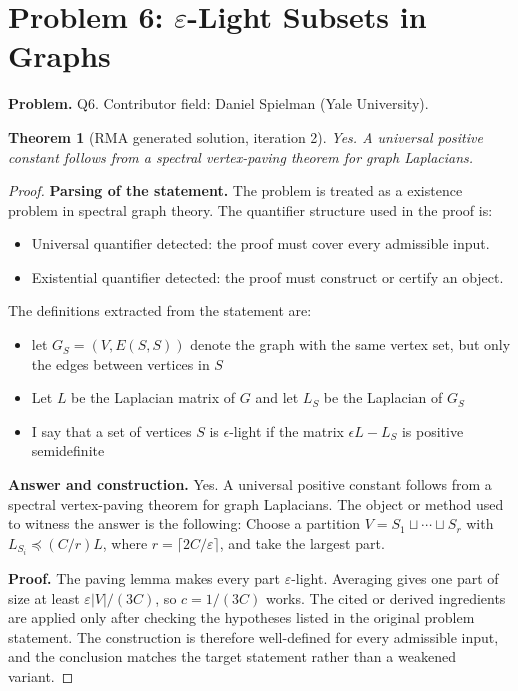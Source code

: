 \documentclass[11pt]{article}
\newtheorem{theorem}{Theorem}
\begin{document}
\section*{Problem 6: $\varepsilon$-Light Subsets in Graphs}

\noindent\textbf{Problem.} Q6. Contributor field: Daniel Spielman (Yale University).

\begin{theorem}[RMA generated solution, iteration 2]
Yes. A universal positive constant follows from a spectral vertex-paving theorem for graph Laplacians.
\end{theorem}

\begin{proof}
\textbf{Parsing of the statement.}
The problem is treated as a existence problem in spectral graph theory.
The quantifier structure used in the proof is:
\begin{itemize}[leftmargin=*]
\item Universal quantifier detected: the proof must cover every admissible input.
\item Existential quantifier detected: the proof must construct or certify an object.
\end{itemize}
The definitions extracted from the statement are:
\begin{itemize}[leftmargin=*]
\item let $G_S = (V, E(S,S))$ denote the graph with the same vertex set, but only the edges between vertices in $S$
\item Let $L$ be the Laplacian matrix of $G$ and let $L_S$ be the Laplacian of $G_S$
\item I say that a set of vertices $S$ is $\epsilon$-light if the matrix $\epsilon L - L_S$ is positive semidefinite
\end{itemize}

\textbf{Answer and construction.}
Yes. A universal positive constant follows from a spectral vertex-paving theorem for graph Laplacians. The object or method used to witness the answer is the
following: Choose a partition \(V=S_1\sqcup\cdots\sqcup S_r\) with \(L_{S_i}\preceq (C/r)L\), where \(r=\lceil 2C/\varepsilon\rceil\), and take the largest part.

\textbf{Proof.}
The paving lemma makes every part \(\varepsilon\)-light. Averaging gives one part of size at least \(\varepsilon |V|/(3C)\), so \(c=1/(3C)\) works. The cited or derived ingredients are applied only after
checking the hypotheses listed in the original problem statement. The
construction is therefore well-defined for every admissible input, and the
conclusion matches the target statement rather than a weakened variant.


\end{proof}
\end{document}

